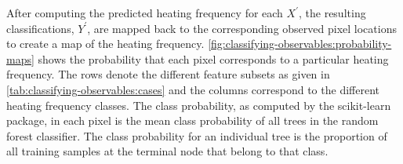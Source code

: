 After computing the predicted heating frequency for each $X^\prime$, the resulting classifications, $Y^\prime$, are mapped back to the corresponding observed pixel locations to create a map of the heating frequency. \autoref{fig:classifying-observables:probability-maps} shows the probability that each pixel corresponds to a particular heating frequency. The rows denote the different feature subsets as given in \autoref{tab:classifying-observables:cases} and the columns correspond to the different heating frequency classes. The class probability, as computed by the scikit-learn package, in each pixel is the mean class probability of all trees in the random forest classifier. The class probability for an individual tree is the proportion of all training samples at the terminal node that belong to that class.

